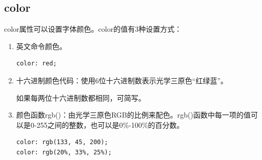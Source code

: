 \subsection{color}

color属性可以设置字体颜色。color的值有3种设置方式：

\begin{enumerate}
	\item 英文命令颜色。 \\
	      \begin{lstlisting}[style=htmlcssjs]
color: red;
    \end{lstlisting}

	\item 十六进制颜色代码：使用6位十六进制数表示光学三原色“红绿蓝”。
	      \begin{table}[H]
		      \centering
		      \caption{颜色代码}
	      \end{table}
	      如果每两位十六进制数都相同，可简写。
	      \begin{table}[H]
		      \centering
		      \caption{常见颜色代码}
	      \end{table}

	\item 颜色函数rgb()：由光学三原色RGB的比例来配色。rgb()函数中每一项的值可以是0-255之间的整数，也可以是0\%-100\%的百分数。 \\
	      \begin{lstlisting}[style=htmlcssjs]
color: rgb(133, 45, 200);
color: rgb(20%, 33%, 25%);
    \end{lstlisting}
\end{enumerate}


